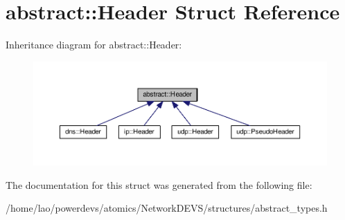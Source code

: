 \hypertarget{structabstract_1_1Header}{}\section{abstract\+:\+:Header Struct Reference}
\label{structabstract_1_1Header}


Inheritance diagram for abstract\+:\+:Header\+:
\nopagebreak
\begin{figure}[H]
\begin{center}
\leavevmode
\includegraphics[width=350pt]{structabstract_1_1Header__inherit__graph}
\end{center}
\end{figure}


The documentation for this struct was generated from the following file\+:\begin{DoxyCompactItemize}
\item 
/home/lao/powerdevs/atomics/\+Network\+D\+E\+V\+S/structures/abstract\+\_\+types.\+h\end{DoxyCompactItemize}
